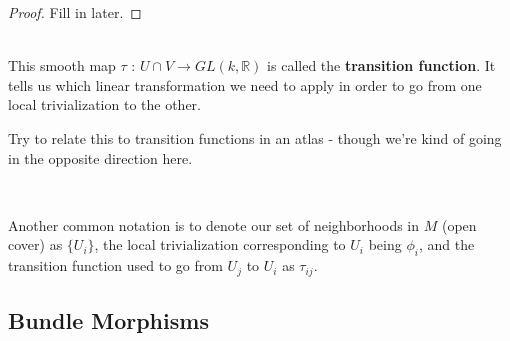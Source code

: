 \documentclass[11pt]{article}
\begin{document}
\begin{proof}
    Fill in later.
\end{proof}
\\
This smooth map $\tau \text{ : } U \cap V \rightarrow GL(k, \mathbb{R})$ is called the \textbf{transition function}. It tells us which linear transformation we need to apply in order to go from one local trivialization to the other. 
\\
\begin{note}
{Try to relate this to transition functions in an atlas - though we're kind of going in the opposite direction here.}
\end{note}
\\
\begin{bluebox}
    Another common notation is to denote our set of neighborhoods in $M$ (open cover) as $\{U_{i}\}$, the local trivialization corresponding to $U_i$ being $\phi_i$, and the transition function used to go from $U_j$ to $U_i$ as $\tau_{ij}$.
\end{bluebox}

\subsection{Bundle Morphisms}
\end{document}
